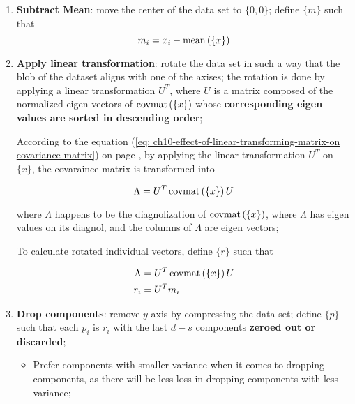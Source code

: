   \begin{enumerate}
    \item \textbf{Subtract Mean}: move the center of the data set to $ \{ 0, 0 \} $; define $ \{ m \} $ such that
    \begin{equation}
      m_{i} = x_{i} - \operatorname{mean}\left( \{ x \} \right)
    \end{equation}
    
    \item \textbf{Apply linear transformation}: rotate the data set in such a way that the blob of the dataset aligns with one of the axises; the rotation is done by applying a linear transformation $ U^{T} $, 
    where $ U $ is a matrix composed of the normalized eigen vectors of $ \operatorname{covmat}\left( \{ x \} \right) $ whose \textbf{corresponding eigen values are sorted in descending order};
    
    According to the equation (\ref{eq: ch10-effect-of-linear-transforming-matrix-on covariance-matrix}) on page \pageref{eq: ch10-effect-of-linear-transforming-matrix-on covariance-matrix}, by applying the linear transformation $ U^{T} $ on $ \{ x \} $, the covaraince matrix is transformed into 
    
    \begin{equation}
      \Lambda = U^{T} \operatorname{covmat}\left( \{ x \} \right) U
    \end{equation}
    
    where $ \Lambda $ happens to be the diagnolization of $ \operatorname{covmat}\left( \{ x \} \right) $, where $ \Lambda $ has eigen values on its diagnol, and the columns of $ \Lambda $ are eigen vectors;
    
    To calculate rotated individual vectors, define $ \{ r \} $ such that
    
    \begin{align}
      \Lambda &= U^{T} \operatorname{covmat}\left( \{ x \} \right) U \\
      r_{i} &= U^{T} m_{i}
    \end{align}
    
    \item \textbf{Drop components}: remove $ y $ axis by compressing the data set; define $ \{ p \} $ such that each $ p_{i} $ is $ r_{i} $ with the last $ d - s $ components \textbf{zeroed out or discarded};
    \begin{itemize}
      \item Prefer components with smaller variance when it comes to dropping components, as there will be less loss in dropping components with less variance;
    \end{itemize}
  \end{enumerate}